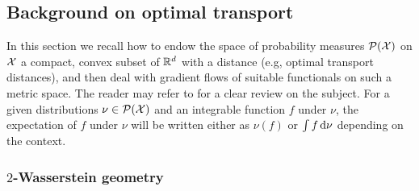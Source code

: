 
\subsection{Background on optimal transport}

In this section we recall how to endow the space of probability measures $\mathcal{P}({{\mathcal X}})$ on ${{\mathcal X}}$ a compact, convex subset of ${{\mathbb R}}^d$ with a distance (e.g, optimal transport distances), and then deal with gradient flows of suitable functionals on such a metric space. The reader may refer to \cite{santambrogio2017euclidean} for a clear review on the subject. For a given distributions $\nu\in\mathcal{P}({{\mathcal X}})$ and an integrable function $f$ under $\nu$, the expectation of $f$ under $\nu$ will be written either as $\nu(f)$ or $\int f \mathop{}\!\mathrm{d}\nu$ depending on the context. 

\subsubsection{$2$-Wasserstein geometry}\label{subsec:wasserstein_flow}

